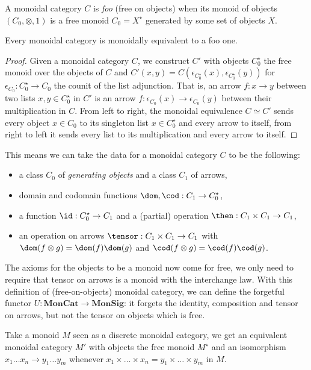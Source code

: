 \begin{definition}
A monoidal category $C$ is \emph{foo} (free on objects) when its monoid of objects $(C_0, \otimes, 1)$ is a free monoid $C_0 = X^\star$ generated by some set of objects $X$.
\end{definition}

\begin{lemma}
Every monoidal category is monoidally equivalent to a foo one.
\end{lemma}

\begin{proof}
Given a monoidal category $C$, we construct $C'$ with objects $C_0^\star$ the free monoid over the objects of $C$ and $C'(x, y) = C(\epsilon_{C_0^\star}(x), \epsilon_{C_0^\star}(y))$ for $\epsilon_{C_0} : C_0^\star \to C_0$ the counit of the list adjunction.
That is, an arrow $f : x \to y$ between two lists $x, y \in C_0^\star$ in $C'$ is an arrow $f : \epsilon_{C_0}(x) \to \epsilon_{C_0}(y)$ between their multiplication in $C$.
From left to right, the monoidal equivalence $C \simeq C'$ sends every object $x \in C_0$ to its singleton list $x \in C_0^\star$ and every arrow to itself, from right to left it sends every list to its multiplication and every arrow to itself.
\end{proof}

This means we can take the data for a monoidal category $C$ to be the following:
\begin{itemize}
\item a class $C_0$ of \emph{generating objects} and a class $C_1$ of arrows,
\item domain and codomain functions $\dom, \cod : C_1 \to C_0^\star$,
\item a function $\id : C_0^\star \to C_1$ and a (partial) operation $\then : C_1 \times C_1 \to C_1$,
\item an operation on arrows $\tensor : C_1 \times C_1 \to C_1$ with $\dom (f \otimes g) = \dom(f) \dom(g)$ and $\cod (f \otimes g) = \cod(f) \cod(g)$.
\end{itemize}
The axioms for the objects to be a monoid now come for free, we only need to require that tensor on arrows is a monoid with the interchange law.
With this definition of (free-on-objects) monoidal category, we can define the forgetful functor $U : \mathbf{MonCat} \to \mathbf{MonSig}$: it forgets the identity, composition and tensor on arrows, but not the tensor on objects which is free.

\begin{example}
Take a monoid $M$ seen as a discrete monoidal category, we get an equivalent monoidal category $M'$ with objects the free monoid $M^\star$ and an isomorphism $x_1 \dots x_n \to y_1 \dots y_m$ whenever $x_1 \times \dots \times x_n = y_1 \times \dots \times y_m$ in $M$.
\end{example}

